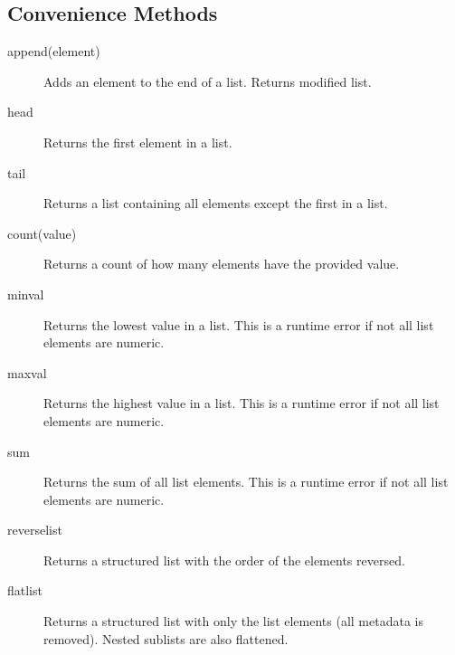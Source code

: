 \subsection{Convenience Methods}

\begin{description}
\item[append(element)]

Adds an element to the end of a list. Returns modified list.

\item[head]

Returns the first element in a list.

\item[tail]

Returns a list containing all elements except the first in a list.

\item[count(value)]

Returns a count of how many elements have the provided value.

\item[minval]

Returns the lowest value in a list. This is a runtime error if not all list elements are numeric.

\item[maxval]

Returns the highest value in a list. This is a runtime error if not all list elements are numeric.

\item[sum]

Returns the sum of all list elements. This is a runtime error if not all list elements are numeric.

\item[reverselist]

Returns a structured list with the order of the elements reversed.

\item[flatlist]

Returns a structured list with only the list elements (all metadata is
removed). Nested sublists are also flattened. 

\end{description}


